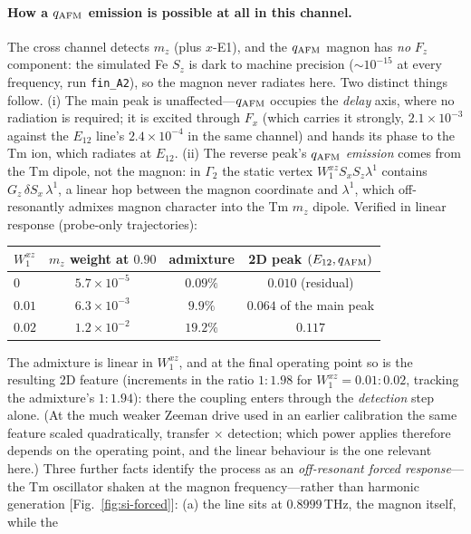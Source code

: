 \documentclass[11pt]{article}
\newcommand{\qafm}{q_{\rm AFM}}
\begin{document}
\paragraph{How a $\qafm$ emission is possible at all in this channel.}
The cross channel detects $m_z$ (plus $x$-E1), and the $\qafm$ magnon
has \emph{no} $F_z$ component: the simulated Fe $S_z$ is dark to
machine precision ($\sim10^{-15}$ at every frequency, run
\texttt{fin\_A2}), so the magnon never radiates here.  Two distinct
things follow.  (i) The main peak is unaffected---$\qafm$ occupies the
\emph{delay} axis, where no radiation is required; it is excited
through $F_x$ (which carries it strongly, $2.1\times10^{-3}$ against
the $E_{12}$ line's $2.4\times10^{-4}$ in the same channel) and hands
its phase to the Tm ion, which radiates at $E_{12}$.  (ii) The reverse
peak's $\qafm$ \emph{emission} comes from the Tm dipole, not the
magnon: in $\Gamma_2$ the static vertex
$W^{xz}_1S_xS_z\lambda^1$ contains $G_z\,\delta S_x\,\lambda^1$, a
linear hop between the magnon coordinate and $\lambda^1$, which
off-resonantly admixes magnon character into the Tm $m_z$ dipole.
Verified in linear response (probe-only trajectories):
\begin{center}\small
\begin{tabular}{lccc}
\hline
$W^{xz}_1$ & $m_z$ weight at $0.90$ & admixture & 2D peak $(E_{12},\qafm)$\\
\hline
$0$    & $5.7\times10^{-5}$ & $0.09\%$ & $0.010$ (residual)\\
$0.01$ & $6.3\times10^{-3}$ & $9.9\%$  & $0.064$ of the main peak\\
$0.02$ & $1.2\times10^{-2}$ & $19.2\%$ & $0.117$\\
\hline
\end{tabular}
\end{center}
The admixture is linear in $W^{xz}_1$, and at the final operating point
so is the resulting 2D feature (increments in the ratio $1:1.98$ for
$W^{xz}_1=0.01:0.02$, tracking the admixture's $1:1.94$): there the
coupling enters through the \emph{detection} step alone.  (At the much
weaker Zeeman drive used in an earlier calibration the same feature
scaled quadratically, transfer $\times$ detection; which power applies
therefore depends on the operating point, and the linear behaviour is
the one relevant here.)  Three further facts identify the process as an
\emph{off-resonant forced response}---the Tm oscillator shaken at the
magnon frequency---rather than harmonic generation
[Fig.~\ref{fig:si-forced}]:
(a) the line sits at $0.8999$\,THz, the magnon itself, while the
\end{document}
